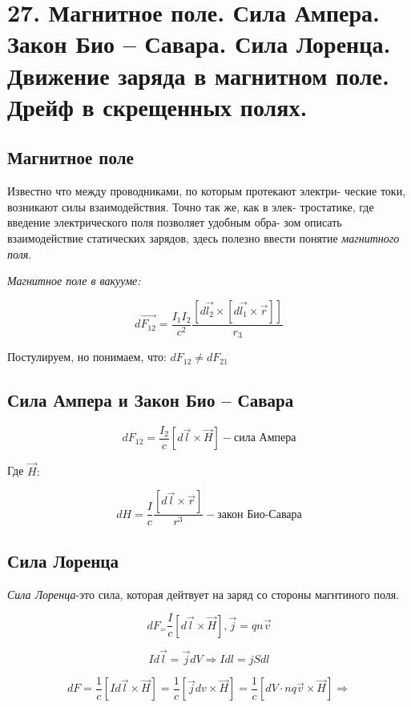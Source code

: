 \section*{27. Магнитное поле. Сила Ампера. Закон Био – Савара. Сила Лоренца.
Движение заряда в магнитном поле. Дрейф в скрещенных полях.}
 
\subsection*{Магнитное поле}


Известно что между проводниками, по которым протекают электри-
ческие токи, возникают силы взаимодействия. Точно так же, как в элек-
тростатике, где введение электрического поля позволяет удобным обра-
зом описать взаимодействие статических зарядов, здесь полезно ввести
понятие \textit{магнитного поля}.

\textit{Магнитное поле в вакууме:}


\[
d\vec{F_{12}}= \frac{I_1 I_2 }{c^2} \frac{[d\vec{l_2}\times [d\vec{l_1}\times \vec{r}]]}{r_{3}}  
\]

Постулируем, но понимаем, что: $dF_{12}\neq dF_{21}$

\subsection*{Сила Ампера и Закон Био – Савара}

\[
dF_{12}=\frac{I_2}{c}[d\vec{l}\times \vec{H}]-\textit{сила Ампера}  
\]

Где $\vec{H}:$

\[
dH=\frac{I}{c} \frac{[d\vec{l} \times \vec{r}]}{r^3} - \textit{закон Био-Савара}  
\]

\subsection*{Сила Лоренца}


\textit{Сила Лоренца}-это сила, которая дейтвует на заряд со стороны магнтиного поля. 

\[
    dF_=\frac{I}{c}[d\vec{l}\times \vec{H}],\vec{j}=qn\vec{v}
\]

\[
Id\vec{l}=\vec{j}dV \Rightarrow Idl=jSdl
\]

\[
dF=\frac{1}{c}[Id\vec{l}\times \vec{H}]=\frac{1}{c}[\vec{j}dv \times \vec{H}]=\frac{1}{c} [dV\cdot nq\vec{v}\times \vec{H} ] \Rightarrow 
\]

